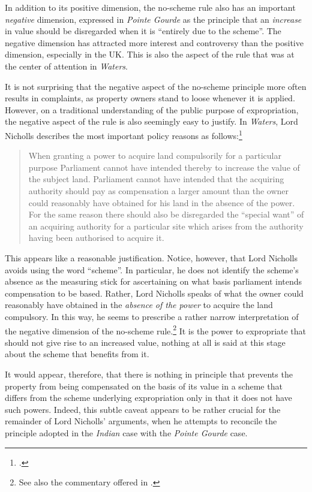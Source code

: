In addition to its positive dimension, the no-scheme rule also has an important \emph{negative} dimension, expressed in {\it Pointe Gourde} as the principle that an {\it increase} in value should be disregarded when it is ``entirely due to the scheme''. The negative dimension has attracted more interest and controversy than the positive dimension, especially in the UK. This is also the aspect of the rule that was at the center of attention in {\it Waters}.

It is not surprising that the negative aspect of the no-scheme principle more often results in complaints, as property owners stand to loose whenever it is applied. However, on a traditional understanding of the public purpose of expropriation, the negative aspect of the rule is also seemingly easy to justify. In \emph{Waters}, Lord Nicholls describes the most important policy reasons as follows:\footcite[18]{waters04}

\begin{quote}
When granting a power to acquire land compulsorily for a particular purpose Parliament cannot have intended thereby to increase the value of the subject land. Parliament cannot have intended that the acquiring authority should pay as compensation a larger amount than the owner could reasonably have obtained for his land in the absence of the power. For the same reason there should also be disregarded the ``special want'' of an acquiring authority for a particular site which arises from the authority having been authorised to acquire it.
\end{quote}

This appears like a reasonable justification. Notice, however, that Lord Nicholls avoids using the word ``scheme''. In particular, he does not identify the scheme's absence as the measuring stick for ascertaining on what basis parliament intends compensation to be based. Rather, Lord Nicholls speaks of what the owner could reasonably have obtained in the \emph{absence of the power} to acquire the land compulsory. In this way, he seems to prescribe a rather narrow interpretation of the negative dimension of the no-scheme rule.\footnote{See also the commentary offered in \cite{newuk}.} It is the power to expropriate that should not give rise to an increased value, nothing at all is said at this stage about the scheme that benefits from it.

It would appear, therefore, that there is nothing in principle that prevents the property from being compensated on the basis of its value in a scheme that differs from the scheme underlying expropriation only in that it does not have such powers. Indeed, this subtle caveat appears to be rather crucial for the remainder of Lord Nicholls' arguments, when he attempts to reconcile the principle adopted in the \emph{Indian} case with the \emph{Pointe Gourde} case.

